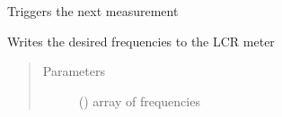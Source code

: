 \documentclass[letterpaper,10pt,english]{sphinxmanual}
\begin{document}
\begin{fulllineitems}
\begin{fulllineitems}
\end{fulllineitems}


\begin{fulllineitems}
\label{\detokenize{drivers:drivers.LCR.trigger}}
Triggers the next measurement

\end{fulllineitems}


\begin{fulllineitems}
\label{\detokenize{drivers:drivers.LCR.write_freq}}
Writes the desired frequencies to the LCR meter
\begin{quote}\begin{description}
\item[{Parameters}] \leavevmode
{} () \textendash{} array of frequencies

\end{description}\end{quote}

\end{fulllineitems}


\end{fulllineitems}

\end{document}
